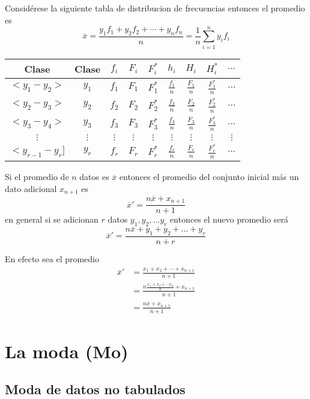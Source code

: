 \documentclass[10pt,]{krantz}
\theoremstyle{definition}
\theoremstyle{definition}
\theoremstyle{definition}
\theoremstyle{remark}
\let\BeginKnitrBlock\begin \let\EndKnitrBlock\end
\begin{document}
Considérese la siguiente tabla de distribucion de frecuencias entonces el promedio es \[\overline{x}=\frac{y_1f_1+y_2f_2+\cdots+y_nf_n}{n}=\frac{1}{n}\sum_{i=1}^ny_if_i\]

\begin{longtable}[]{@{}ccccccccc@{}}
\toprule
Clase & Clase & \(f_i\) & \(F_i\) & \(F_i^*\) & \(h_i\) & \(H_i\) & \(H_i^*\) & \(\ldots\)\tabularnewline
\midrule
\endhead
\(<y_1-y_2>\) & \(y_1\) & \(f_1\) & \(F_1\) & \(F_1^*\) & \(\frac{f_1}{n}\) & \(\frac{F_1}{n}\) & \(\frac{F_1^*}{n}\) & \(\ldots\)\tabularnewline
\(<y_2-y_3>\) & \(y_2\) & \(f_2\) & \(F_2\) & \(F_2^*\) & \(\frac{f_2}{n}\) & \(\frac{F_2}{n}\) & \(\frac{F_2^*}{n}\) & \(\ldots\)\tabularnewline
\(<y_3-y_4>\) & \(y_3\) & \(f_3\) & \(F_3\) & \(F_3^*\) & \(\frac{f_3}{n}\) & \(\frac{F_3}{n}\) & \(\frac{F_3^*}{n}\) & \(\ldots\)\tabularnewline
\(\vdots\) & \(\vdots\) & \(\vdots\) & \(\vdots\) & \(\vdots\) & \(\vdots\) & \(\vdots\) & \(\vdots\) & \(\vdots\)\tabularnewline
\(<y_{r-1}-y_r]\) & \(y_r\) & \(f_r\) & \(F_r\) & \(F_r^*\) & \(\frac{f_r}{n}\) & \(\frac{F_r}{n}\) & \(\frac{F_r^*}{n}\) & \(...\)\tabularnewline
\bottomrule
\end{longtable}

\BeginKnitrBlock{exercise}
\protect\hypertarget{exr:unnamed-chunk-5}{}{\label{exr:unnamed-chunk-5} }Si el promedio de \(n\) datos es \(\overline{x}\) entonces el promedio del conjunto inicial más un dato adicional \(x_{n+1}\) es \[\overline{x}'=\frac{n\overline{x}+x_{n+1}}{n+1}\] en general si se adicionan \(r\) datos \(y_1, y_2, \ldots y_r\) entonces el nuevo promedio será \[\overline{x}'=\frac{n\overline{x}+y_{1}+y_2+\ldots+y_r}{n+r}\]
\EndKnitrBlock{exercise}

\BeginKnitrBlock{solution}
\iffalse{} {Solución. } \fi{}En efecto sea el promedio
\begin{align*}
\overline{x}'&=\frac{x_1+x_2+\cdots+x_{n+1}}{n+1}\\
&=\frac{n\frac{x_1+x_2+\cdots x_n}{n}+x_{n+1}}{n+1}\\
&=\frac{n\overline{x}+x_{n+1}}{n+1}
\end{align*}
\EndKnitrBlock{solution}

\hypertarget{la-moda-mo}{%
\section{La moda (Mo)}\label{la-moda-mo}}

\hypertarget{moda-de-datos-no-tabulados}{%
\subsection{Moda de datos no tabulados}\label{moda-de-datos-no-tabulados}}
\end{document}
